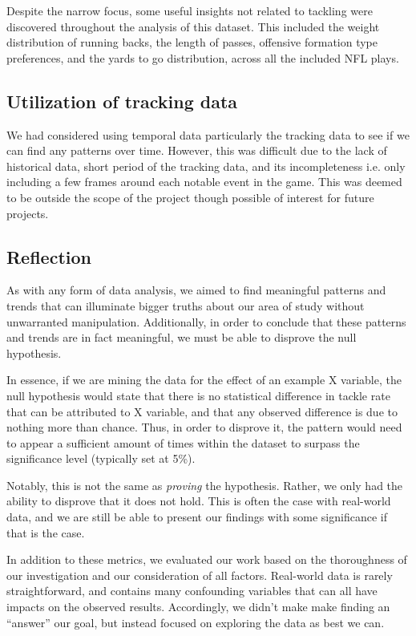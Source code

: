 \documentclass[bibtex, sigconf, hyperref={colorlinks=true,linkcolor=blue,urlcolor=blue}]{acmart}
\begin{document}
Despite the narrow focus, some useful insights not related to tackling were
discovered throughout the analysis of this dataset. This included the weight
distribution of running backs, the length of passes, offensive formation type
preferences, and the yards to go distribution, across all the included NFL
plays.

\subsection{Utilization of tracking data}

We had considered using temporal data particularly the tracking data to see if
we can find any patterns over time. However, this was difficult due to the
lack of historical data, short period of the tracking data, and its
incompleteness i.e. only including a few frames around each notable event in the
game. This was deemed to be outside the scope of the project though possible of
interest for future projects.

\subsection{Reflection}

As with any form of data analysis, we aimed to find meaningful patterns and
trends that can illuminate bigger truths about our area of study without
unwarranted manipulation. Additionally, in order to conclude that these patterns
and trends are in fact meaningful, we must be able to disprove the null
hypothesis.

In essence, if we are mining the data for the effect of an example X variable,
the null hypothesis would state that there is no statistical difference in
tackle rate that can be attributed to X variable, and that any observed
difference is due to nothing more than chance. Thus, in order to disprove it,
the pattern would need to appear a sufficient amount of times within the dataset
to surpass the significance level (typically set at 5\%).

Notably, this is not the same as \textit{proving} the hypothesis. Rather, we
only had the ability to disprove that it does not hold. This is often the case
with real-world data, and we are still be able to present our findings with some
significance if that is the case.

In addition to these metrics, we evaluated our work based on the thoroughness of
our investigation and our consideration of all factors. Real-world data is
rarely straightforward, and contains many confounding variables that can all
have impacts on the observed results. Accordingly, we didn't make make finding
an “answer” our goal, but instead focused on exploring the data as best we can.
\end{document}

